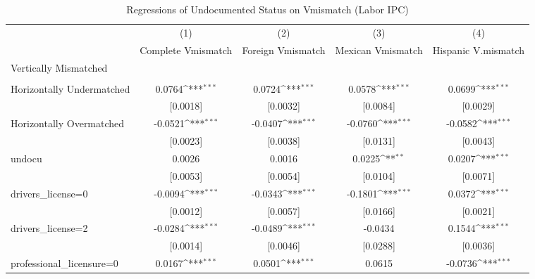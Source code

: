 \begin{table}[htbp]\centering
\def\sym#1{\ifmmode^{#1}\else\(^{#1}\)\fi}
\caption{Regressions of Undocumented Status on Vmismatch (Labor IPC)}
\begin{tabular}{l*{4}{c}}
\toprule
                    &\multicolumn{1}{c}{(1)}         &\multicolumn{1}{c}{(2)}         &\multicolumn{1}{c}{(3)}         &\multicolumn{1}{c}{(4)}         \\
                    &Complete Vmismatch         &Foreign Vmismatch         &Mexican Vmismatch         &Hispanic V.mismatch         \\
\midrule
Vertically Mismatched&                     &                     &                     &                     \\
                    &                     &                     &                     &                     \\
\addlinespace
Horizontally Undermatched&      0.0764\sym{***}&      0.0724\sym{***}&      0.0578\sym{***}&      0.0699\sym{***}\\
                    &    [0.0018]         &    [0.0032]         &    [0.0084]         &    [0.0029]         \\
\addlinespace
Horizontally Overmatched&     -0.0521\sym{***}&     -0.0407\sym{***}&     -0.0760\sym{***}&     -0.0582\sym{***}\\
                    &    [0.0023]         &    [0.0038]         &    [0.0131]         &    [0.0043]         \\
\addlinespace
undocu              &      0.0026         &      0.0016         &      0.0225\sym{**} &      0.0207\sym{***}\\
                    &    [0.0053]         &    [0.0054]         &    [0.0104]         &    [0.0071]         \\
\addlinespace
drivers\_license=0   &     -0.0094\sym{***}&     -0.0343\sym{***}&     -0.1801\sym{***}&      0.0372\sym{***}\\
                    &    [0.0012]         &    [0.0057]         &    [0.0166]         &    [0.0021]         \\
\addlinespace
drivers\_license=2   &     -0.0284\sym{***}&     -0.0489\sym{***}&     -0.0434         &      0.1544\sym{***}\\
                    &    [0.0014]         &    [0.0046]         &    [0.0288]         &    [0.0036]         \\
\addlinespace
professional\_licensure=0&      0.0167\sym{***}&      0.0501\sym{***}&      0.0615         &     -0.0736\sym{***}\\

\end{tabular}
\end{table}
